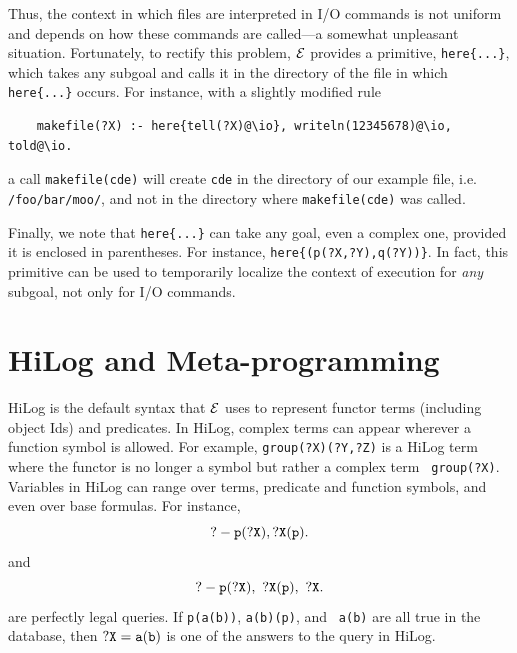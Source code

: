 \documentclass[11pt]{article}
\newcommand{\ERGO}{\mbox{\ensuremath{\cal{E}}\smaller{{\sc{RGO}}}}\xspace}
\newcommand{\FLSYSTEM}{\ERGO}
\begin{document}
Thus, the context in which files are interpreted in I/O commands is not
uniform and depends on how these commands are called---a somewhat
unpleasant situation. Fortunately, to rectify this problem, \FLSYSTEM
provides a primitive, \texttt{here\{...\}}, which takes any subgoal and
calls it in the directory of the file in which \texttt{here\{...\}} occurs.
For instance, with a slightly modified rule
\begin{verbatim}
    makefile(?X) :- here{tell(?X)@\io}, writeln(12345678)@\io, told@\io.
\end{verbatim}
a call \texttt{makefile(cde)} will create \texttt{cde} in the directory of
our example file, i.e. \texttt{/foo/bar/moo/}, and not in the directory where 
\texttt{makefile(cde)} was called. 

Finally, we note that \texttt{here\{...\}} can take any goal, even a
complex one, provided it is enclosed in parentheses. For instance,
\texttt{here\{(p(?X,?Y),q(?Y))\}}. In fact, this primitive can be used to
temporarily localize the context of execution for \emph{any} subgoal, not
only for I/O commands.




\section{HiLog and Meta-programming} \label{sec:hilog}


%
HiLog \cite{hilog-jlp} is the default syntax that \FLSYSTEM uses to
represent functor terms (including object Ids) and predicates.  In
HiLog, complex terms can appear wherever a function symbol is
allowed. For example, {\tt group(?X)(?Y,?Z)} is a HiLog term where the
functor is no longer a symbol but rather a complex term {\tt
group(?X)}. Variables in HiLog can range over terms, predicate and
function symbols, and even over base formulas. For instance,
\[
{\tt
 ?- p(?X), ?X(p).
}
\]
\noindent
and
\begin{equation}\label{eq-hilog-notallowed}
{\tt
 ?- p(?X), ~?X(p), ~?X.  
}
\end{equation}
\noindent
are perfectly legal queries. If {\tt p(a(b))}, {\tt a(b)(p)}, and {\tt
a(b)} are all true in the database, then $\tt ?X=a(b)$ is one of the answers
to the query in HiLog.

\end{document}
